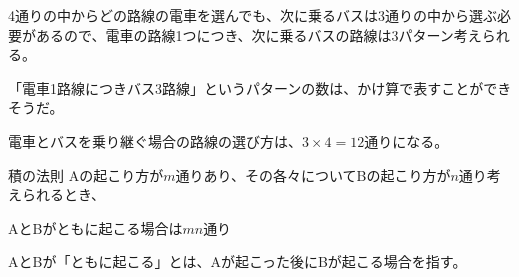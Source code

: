 \documentclass[../../../topic_statistics]{subfiles}
\begin{document}
4通りの中からどの路線の電車を選んでも、次に乗るバスは3通りの中から選ぶ必要があるので、電車の路線1つにつき、次に乗るバスの路線は3パターン考えられる。

\br

「電車1路線につきバス3路線」というパターンの数は、かけ算で表すことができそうだ。

電車とバスを乗り継ぐ場合の路線の選び方は、$3 \times 4 = 12$通りになる。

\begin{theorem}{積の法則}
  Aの起こり方が$m$通りあり、その各々についてBの起こり方が$n$通り考えられるとき、
  \begin{center}
    AとBがともに起こる場合は$mn$通り
  \end{center}
\end{theorem}

AとBが「ともに起こる」とは、Aが起こった後にBが起こる場合を指す。

\br
\end{document}
